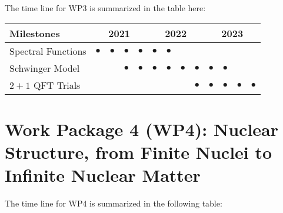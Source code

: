 \documentclass[11pt]{article}
\begin{document}
The time line for WP3 is summarized in the table here:

\begin{footnotesize}
\begin{center}
\begin{tabular}{|l|c|c|c|c|c|c|c|c|c|c|c|c|}
\hline
\multicolumn{1}{|l}{Milestones } & \multicolumn{4}{|c|}{ 2021 } & \multicolumn{4}{c|}{ 2022 } & \multicolumn{4}{c|}{ 2023 } \\
\hline
Spectral  Functions   & $\bullet$&$\bullet$ & $\bullet$&$\bullet$ &$\bullet$ &$\bullet$ & & & & &  &  \\
\hline
Schwinger  Model & & &$\bullet$ &$\bullet$ & $\bullet$ &$\bullet$ & $\bullet$ & $\bullet$ &$\bullet$ & $\bullet$ &  &  \\
\hline
$2+1$ QFT Trials & && & & & & & $\bullet$ & $\bullet$ &$\bullet$ & $\bullet$& $\bullet$ \\
\hline

\end{tabular}
\end{center}
\end{footnotesize}


\section{Work Package 4 (WP4): Nuclear Structure, from Finite Nuclei to Infinite Nuclear Matter}

The time line for WP4 is summarized in the following table:

\end{document}
